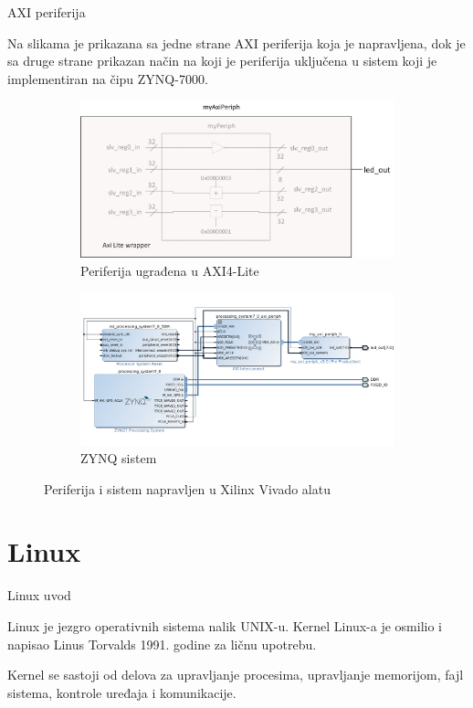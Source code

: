 \documentclass[10pt]{beamer}
\begin{document}
\begin{frame}{AXI periferija}

	Na slikama je prikazana sa jedne strane AXI periferija koja je napravljena, dok je sa druge strane prikazan način na koji je periferija uključena u sistem koji je implementiran na čipu ZYNQ-7000.
	
	
	\begin{figure}
		\centering
		\begin{subfigure}{.5\textwidth}
  			\centering
 			\includegraphics[width=.75\linewidth]{images/myaxiperiph.png}
  			\caption{Periferija ugrađena u AXI4-Lite}
  			\label{fig:axiPeripheral}
		\end{subfigure}%
		\begin{subfigure}{.5\textwidth}
  			\centering
  			\includegraphics[width=.9\linewidth]{images/zc702system_vivado.png}
  			\caption{ZYNQ sistem}
  			\label{fig:zynqSystem}
		\end{subfigure}
		\caption{Periferija i sistem napravljen u Xilinx Vivado alatu}
		\label{fig:axiSystem}
	\end{figure}
	
\end{frame}


\section{Linux}

\begin{frame}{Linux uvod}
	
	Linux je jezgro operativnih sistema nalik UNIX-u. Kernel Linux-a je osmilio i napisao Linus Torvalds 1991. godine za ličnu upotrebu.
	
	\bigskip	
	
	Kernel se sastoji od delova za upravljanje procesima, upravljanje memorijom, fajl sistema, kontrole uređaja i komunikacije.
	
	
\end{frame}
\end{document}

